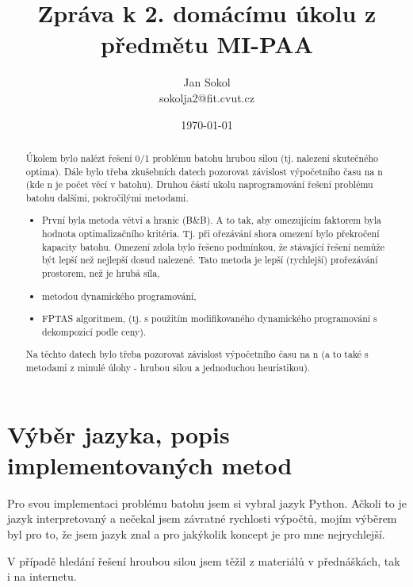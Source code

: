 \documentclass[a4paper,10pt,twocolumn]{article}
\title{Zpráva k 2. domácímu úkolu z předmětu MI-PAA}
\date{\today}
\author{Jan Sokol \\ sokolja2@fit.cvut.cz}
\begin{document}
\maketitle
\begin{abstract}
Úkolem bylo nalézt řešení 0/1 problému batohu hrubou silou (tj. nalezení skutečného optima). Dále bylo třeba zkušebních datech pozorovat závislost výpočetního času na n (kde n je počet věcí v batohu). Druhou částí ukolu naprogramování řešení problému batohu dalšími, pokročilými metodami.
 \begin{itemize}
\item První byla metoda větví a hranic (B\&B). A to tak, aby omezujícím faktorem byla hodnota optimalizačního kritéria. Tj. při ořezávání shora omezení bylo překročení kapacity batohu. Omezení zdola bylo řešeno podmínkou, že stávající řešení nemůže být lepší než nejlepší dosud nalezené. Tato metoda je lepší (rychlejší) prořezávání prostorem, než je hrubá síla,
\item metodou dynamického programování,
\item FPTAS algoritmem, (tj. s použitím modifikovaného dynamického programování s dekompozicí podle ceny).

\end{itemize} 
Na těchto datech bylo třeba pozorovat závislost výpočetního času na n (a to také s metodami z minulé úlohy - hrubou silou a jednoduchou heuristikou).




\end{abstract}

\section{Výběr jazyka, popis implementovaných metod}
Pro svou implementaci problému batohu jsem si vybral jazyk Python. Ačkoli to je jazyk interpretovaný a nečekal jsem závratné rychlosti výpočtů, mojím výběrem byl pro to, že jsem jazyk znal a pro jakýkolik koncept je pro mne nejrychlejší.

V případě hledání řešení hroubou silou jsem těžil z materiálů v přednáškách, tak i na internetu.
\end{document}
